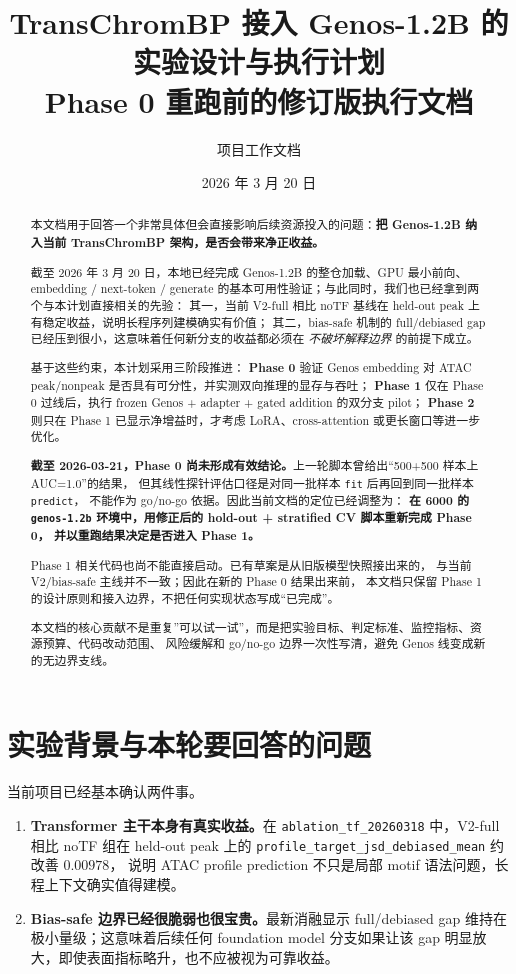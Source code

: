 \documentclass[11pt,a4paper]{ctexart}
\title{TransChromBP 接入 Genos-1.2B 的实验设计与执行计划\\
\large Phase 0 重跑前的修订版执行文档}
\author{项目工作文档}
\date{2026 年 3 月 20 日}
\begin{document}
\maketitle
\onehalfspacing

\begin{abstract}
本文档用于回答一个非常具体但会直接影响后续资源投入的问题：\textbf{把 Genos-1.2B 纳入当前
TransChromBP 架构，是否会带来净正收益。}

截至 2026 年 3 月 20 日，本地已经完成 Genos-1.2B 的整仓加载、GPU 最小前向、embedding /
next-token / generate 的基本可用性验证；与此同时，我们也已经拿到两个与本计划直接相关的先验：
其一，当前 V2-full 相比 noTF 基线在 held-out peak 上有稳定收益，说明长程序列建模确实有价值；
其二，bias-safe 机制的 full/debiased gap 已经压到很小，这意味着任何新分支的收益都必须在
\emph{不破坏解释边界} 的前提下成立。

基于这些约束，本计划采用三阶段推进：
\textbf{Phase 0} 验证 Genos embedding 对 ATAC peak/nonpeak 是否具有可分性，并实测双向推理的显存与吞吐；
\textbf{Phase 1} 仅在 Phase 0 过线后，执行 frozen Genos + adapter + gated addition 的双分支 pilot；
\textbf{Phase 2} 则只在 Phase 1 已显示净增益时，才考虑 LoRA、cross-attention 或更长窗口等进一步优化。

\textbf{截至 2026-03-21，Phase 0 尚未形成有效结论。}上一轮脚本曾给出“500+500 样本上 AUC=1.0”的结果，
但其线性探针评估口径是对同一批样本 \texttt{fit} 后再回到同一批样本 \texttt{predict}，
不能作为 go/no-go 依据。因此当前文档的定位已经调整为：
\textbf{在 6000 的 \texttt{genos-1.2b} 环境中，用修正后的 hold-out + stratified CV 脚本重新完成 Phase 0，
并以重跑结果决定是否进入 Phase 1。}

Phase 1 相关代码也尚不能直接启动。已有草案是从旧版模型快照接出来的，
与当前 V2/bias-safe 主线并不一致；因此在新的 Phase 0 结果出来前，
本文档只保留 Phase 1 的设计原则和接入边界，不把任何实现状态写成“已完成”。

本文档的核心贡献不是重复”可以试一试”，而是把实验目标、判定标准、监控指标、资源预算、代码改动范围、
风险缓解和 go/no-go 边界一次性写清，避免 Genos 线变成新的无边界支线。
\end{abstract}

\tableofcontents

\section{实验背景与本轮要回答的问题}

当前项目已经基本确认两件事。

\begin{enumerate}[leftmargin=2em]
  \item \textbf{Transformer 主干本身有真实收益。}在
  \texttt{ablation\_tf\_20260318} 中，V2-full 相比 noTF 组在 held-out peak 上的
  \texttt{profile\_target\_jsd\_debiased\_mean} 约改善 $0.00978$，
  说明 ATAC profile prediction 不只是局部 motif 语法问题，长程上下文确实值得建模。
  \item \textbf{Bias-safe 边界已经很脆弱也很宝贵。}最新消融显示
  full/debiased gap 维持在极小量级；这意味着后续任何 foundation model 分支如果让该 gap
  明显放大，即使表面指标略升，也不应被视为可靠收益。
\end{enumerate}
\end{document}
